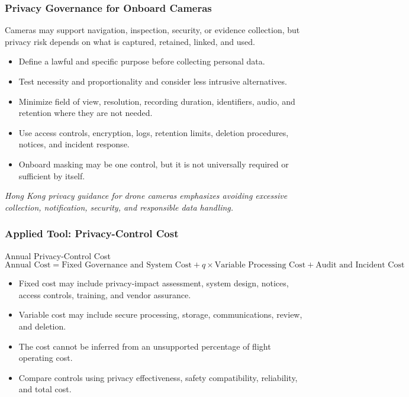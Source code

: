 \documentclass{beamer}
\begin{document}
\begin{frame}[t]
\frametitle{Privacy Governance for Onboard Cameras}
Cameras may support navigation, inspection, security, or evidence collection, but privacy risk depends on what is captured, retained, linked, and used.
\begin{itemize}
\item Define a lawful and specific purpose before collecting personal data.
\item Test necessity and proportionality and consider less intrusive alternatives.
\item Minimize field of view, resolution, recording duration, identifiers, audio, and retention where they are not needed.
\item Use access controls, encryption, logs, retention limits, deletion procedures, notices, and incident response.
\item Onboard masking may be one control, but it is not universally required or sufficient by itself.
\end{itemize}
\textit{Hong Kong privacy guidance for drone cameras emphasizes avoiding excessive collection, notification, security, and responsible data handling.}
\end{frame}

\begin{frame}[t]
\frametitle{Applied Tool: Privacy-Control Cost}
\begin{block}{Annual Privacy-Control Cost}
\[
\text{Annual Cost}=\text{Fixed Governance and System Cost}
+q\times\text{Variable Processing Cost}
+\text{Audit and Incident Cost}
\]
\end{block}
\begin{itemize}
\item Fixed cost may include privacy-impact assessment, system design, notices, access controls, training, and vendor assurance.
\item Variable cost may include secure processing, storage, communications, review, and deletion.
\item The cost cannot be inferred from an unsupported percentage of flight operating cost.
\item Compare controls using privacy effectiveness, safety compatibility, reliability, and total cost.
\end{itemize}
\end{frame}
\end{document}
